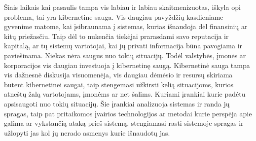 Šiais laikais kai pasaulis tampa vis labiau ir labiau skaitmenizuotas, iškyla opi problema, tai yra kibernetine sauga. Vis daugiau pavyždžių kasdieniame gyvenime matome, kai įsibraunama į sistemas, kurias
išnaudoja dėl finansinių ar kitų priežasčiu. Taip dėl to nukenčia tiekėjai prarasdami savo reputacija ir kapitalą, ar tų sistemų
vartotojai, kai jų privati informacija būna pavogiama ir paviešinama. Niekas nėra saugus nuo tokių situacijų. Todėl valstybės, įmonės ar korporacijos vis daugiau investuoja
į kibernetinę saugą. Kibernetinė sauga tampa vis dažnesnė diskusija visuomenėja, vis daugiau
dėmėsio ir resursų skiriama butent kibernetinei saugai, taip stengemasi užkirsti kelią situacijoms, kurios atneštų žalą vartotojams, įmonėms ar net šalims. Kuriami
įrankiai kurie padėtu apsisaugoti nuo tokių situacijų. Šie įrankiai analizuoja sistemas ir randa jų spragas, taip pat pritaikomos įvairios technologijos ar metodai
kurie perspėja apie galima ar vykstančią ataką prieš sistemą, stengiamasi rasti sistemoje spragas ir
užlopyti jas kol jų nerado asmenys kurie išnaudotų jas.